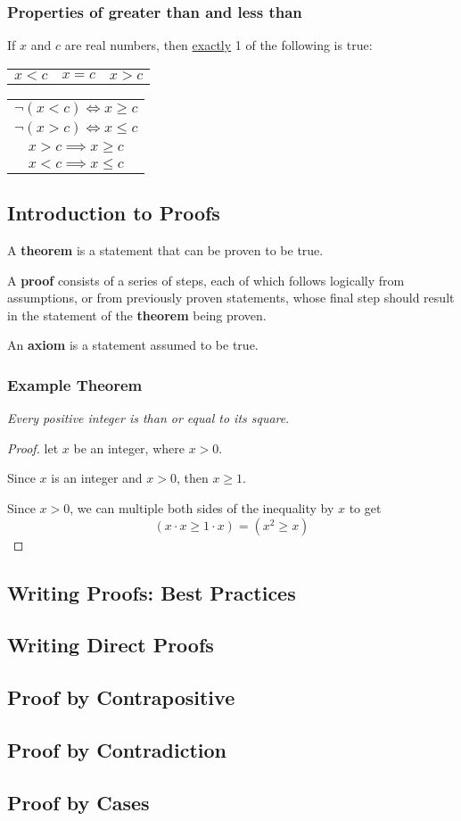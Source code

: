 \subsubsection*{Properties of greater than  and less than}

If $x$ and $c$ are real numbers, then \underline{exactly} 1 of the following is true:
\begin{center}
  \begin{tabular}{ccc}
    $x<c$ & $x=c$ & $x>c$
  \end{tabular}
  \begin{tabular}{c}
    $\lnot (x < c) \Leftrightarrow x \geq c$ \\
    $\lnot (x > c) \Leftrightarrow x \leq c$ \\
    \hline
    $x > c \implies x \geq c$                \\
    $x < c \implies x \leq c$
  \end{tabular}
\end{center}

\subsection{Introduction to Proofs}
A \textbf{theorem} is a statement that can be proven to be true.

A \textbf{proof} consists of a series of steps, each of which follows
logically from assumptions, or from previously proven statements,
whose final step should result in the statement of the \textbf{theorem} being proven.

An \textbf{axiom} is a statement assumed to be true.
\subsubsection*{Example Theorem}
\textit{Every positive integer is than or equal to its square}.
\begin{proof}
  let $x$ be an integer, where $x>0$.

  Since $x$ is an integer and $x>0$, then $x \geq 1$.

  Since $x > 0$, we can multiple both sides of the inequality by $x$ to get
  \[
    (x \cdot x \geq 1 \cdot x) = (x^2 \geq x)
  \]
\end{proof}
\subsection{Writing Proofs: Best Practices}
\subsection{Writing Direct Proofs}
\subsection{Proof by Contrapositive}
\subsection{Proof by Contradiction}
\subsection{Proof by Cases}